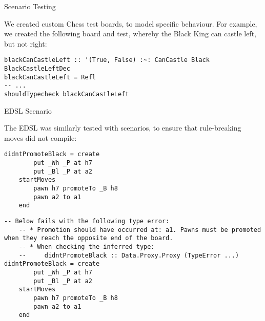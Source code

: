 \documentclass{beamer}
\begin{document}
\begin{frame}[fragile]{Scenario Testing}
    
We created custom Chess test boards, to model specific behaviour. For example, we created the following board and test, whereby the Black King can castle left, but not right:

\begin{figure}[h]
    \centering
    \scalebox{0.55}{\showboard}
    \label{blackcastleleft}
\end{figure}

\begin{lstlisting}
blackCanCastleLeft :: '(True, False) :~: CanCastle Black BlackCastleLeftDec
blackCanCastleLeft = Refl
-- ...
shouldTypecheck blackCanCastleLeft
\end{lstlisting}

\end{frame}

\begin{frame}[fragile]{EDSL Scenario}

The EDSL was similarly tested with scenarios, to ensure that rule-breaking moves did not compile:

\begin{overprint}
    
\begin{lstlisting}
didntPromoteBlack = create
        put _Wh _P at h7
        put _Bl _P at a2
    startMoves
        pawn h7 promoteTo _B h8
        pawn a2 to a1
    end
\end{lstlisting}

\begin{lstlisting}
-- Below fails with the following type error:
    -- * Promotion should have occurred at: a1. Pawns must be promoted when they reach the opposite end of the board.
    -- * When checking the inferred type:
    --     didntPromoteBlack :: Data.Proxy.Proxy (TypeError ...)
didntPromoteBlack = create
        put _Wh _P at h7
        put _Bl _P at a2
    startMoves
        pawn h7 promoteTo _B h8
        pawn a2 to a1
    end
\end{lstlisting}

\end{overprint}
    
\end{frame}
\end{document}
